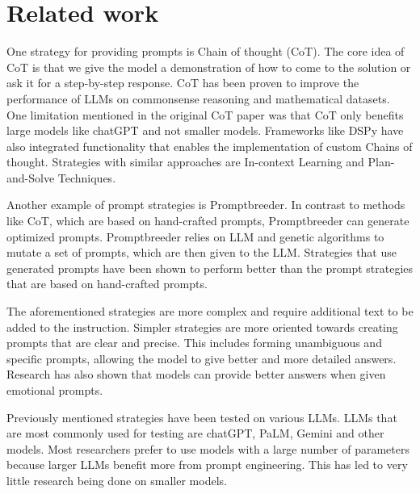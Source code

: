 \documentclass[fleqn,moreauthors,10pt]{ds_report}
\begin{document}
    \section*{Related work}
    One strategy for providing prompts is Chain of thought (CoT)\newline\cite{wei2023chainofthought}. The core idea of CoT is that we give the model a demonstration of how to come to the solution or ask it for a step-by-step response. CoT has been proven to improve the performance of LLMs on commonsense reasoning and mathematical datasets. One limitation mentioned in the original CoT paper was that CoT only benefits large models like chatGPT and not smaller models. Frameworks like DSPy\cite{khattab2023dspy} have also integrated functionality that enables the implementation of custom Chains of thought. Strategies with similar approaches are In-context Learning\cite{luo2024incontext} and Plan-and-Solve Techniques\cite{wang2023planandsolve}.
    
    Another example of prompt strategies is Promptbreeder\cite{fernando2023promptbreeder}. In contrast to methods like CoT, which are based on hand-crafted prompts, Promptbreeder can generate optimized prompts. Promptbreeder relies on LLM and genetic algorithms to mutate a set of prompts, which are then given to the LLM. Strategies that use generated prompts have been shown to perform better than the prompt strategies that are based on hand-crafted prompts.

    The aforementioned strategies are more complex and require additional text to be added to the instruction. Simpler strategies are more oriented towards creating prompts that are clear and precise\cite{chen2023unleashing}. This includes forming unambiguous and specific prompts, allowing the model to give better and more detailed answers. Research has also shown that models can provide better answers when given emotional prompts\cite{li2023large}.
    
    Previously mentioned strategies have been tested on various LLMs. LLMs that are most commonly used for testing are chatGPT\cite{openai2024gpt4}, PaLM\cite{chowdhery2022palm}, Gemini\cite{geminiteam2023gemini} and other models. Most researchers prefer to use models with a large number of parameters because larger LLMs benefit more from prompt engineering. This has led to very little research being done on smaller models.
    
\end{document}
